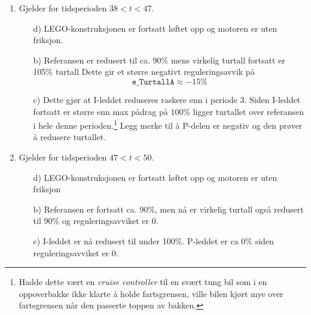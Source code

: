 \begin{enumerate}[1.]
\begin{figure}[H]
  \centering
  \hspace*{-5mm}
  \caption{Målinger og beregninger fra et eksperiment som viser
    hva som skjer dersom integratoren ikke begrenses når 
    turtallregulatoren ikke klarer å følge referansen. Følgende
    parametre ble benyttet: {\tt alfa1=0.3}, {\tt Kp=1}, {\tt Ki=2},
    {\tt Kd=0}.
    a):~Beregnede pådragsverdier fra PI-regulatoren. 
    b):~Referanse fra potensiometerert (blått) og beregnet
    turtall (rødt). 
    c):~Bidragene fra P-del (rødt) og I-del (grønt), og totalpådraget {\tt
      PowerA} (blått). 
    d):~Avstandsmålinger fra ultralydsensoren.
    Forklaring
    til resultatene er gitt i teksten.}
  \label{fig:windup}
\end{figure}
\newpage
\item Gjelder for tidsperioden $38{<}t{<}47$.
  \begin{itemize}
  \item [d)]   LEGO-konstruksjonen er
  fortsatt løftet opp og motoren er uten
  friksjon.
  \item [b)] Referansen er redusert til ca. 90\% mens virkelig turtall
  fortsatt er  105\% turtall
  Dette gir et større negativt
  reguleringsavvik på 
  \begin{equation}
      \mathtt{e\_{TurtallA}}\approx -15\%
  \end{equation}
  \item [c)] Dette gjør at I-leddet reduseres raskere enn i periode 3. 
    Siden I-leddet fortsatt er større enn max pådrag på 100\% ligger
  turtallet over referansen i hele denne perioden.\footnote{Hadde
    dette vært en {\em cruise controller} til en svært tung bil som i
    en oppoverbakke ikke klarte å holde fartsgrensen, ville bilen
    kjørt mye over fartsgrensen når den passerte toppen av bakken.}
  Legg merke til å P-delen er negativ og den prøver å redusere
  turtallet. 
\end{itemize}
\item Gjelder for tidsperioden $47{<}t{<}50$.
  \begin{itemize}
  \item [d)]   LEGO-konstruksjonen er
  fortsatt løftet opp og motoren er uten
  friksjon
 \item [b)] Referansen er fortsatt ca. 90\%,  men nå er virkelig
   turtall også redusert til  90\% og reguleringsavviket er 0.
 \item [c)]  I-leddet er nå redusert til under 100\%. P-leddet er ca
   0\% siden reguleringsavviket er 0.
 \end{itemize}
\end{enumerate}


